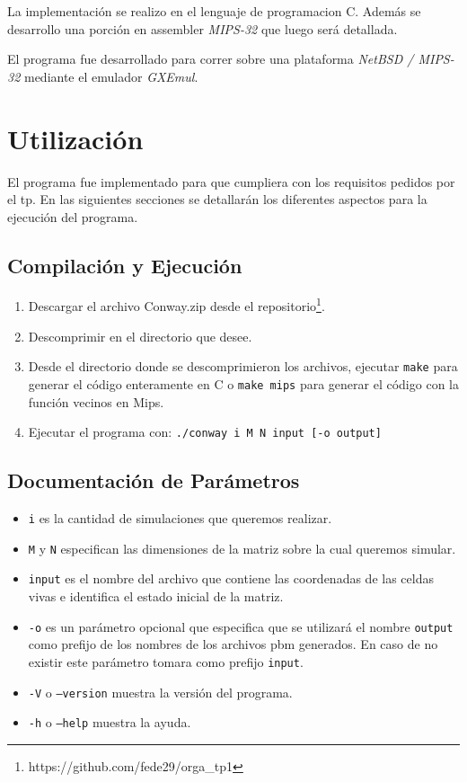 \documentclass[11pt,a4paper]{article}
\begin{document}
La implementación se realizo en el lenguaje de programacion C. Además se desarrollo una porción en assembler \emph{MIPS-32} que luego será detallada.

El programa fue desarrollado para correr sobre una plataforma \emph{NetBSD / MIPS-32} mediante el emulador \emph{GXEmul}.

\section{Utilización}
El programa fue implementado para que cumpliera con los requisitos pedidos por el tp.
En las siguientes secciones se detallarán los diferentes aspectos para la ejecución del programa.

\subsection{Compilación y Ejecución}
\begin{enumerate}
	\item Descargar el archivo Conway.zip desde el repositorio\footnote{https://github.com/fede29/orga\_tp1}.\\
	\item Descomprimir en el directorio que desee.
	\item Desde el directorio donde se descomprimieron los archivos, ejecutar \texttt{make} para generar el código enteramente en C o \texttt{make mips} para generar el código con la función vecinos en Mips.
	\item Ejecutar el programa con: \texttt{./conway i M N input [-o output]}
\end{enumerate}

\subsection{Documentación de Parámetros}
\begin{itemize}
	\item \texttt{i} es la cantidad de simulaciones que queremos realizar.
	\item \texttt{M} y \texttt{N} especifican las dimensiones de la matriz sobre la cual queremos simular.
	\item \texttt{input} es el nombre del archivo que contiene las coordenadas de las celdas vivas e identifica el estado inicial de la matriz.
	\item \texttt{-o} es un parámetro opcional que especifica que se utilizará el nombre \texttt{output} como prefijo de los nombres de los archivos pbm generados. En caso de no existir este parámetro tomara como prefijo \texttt{input}.
	\item \texttt{-V} o \texttt{--version} muestra la versión del programa.
	\item \texttt{-h} o \texttt{--help} muestra la ayuda.
\end{itemize}
\end{document}
